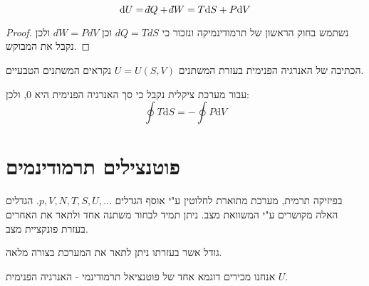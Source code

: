 \documentclass{tstextbook}
\begin{document}
\begin{proposition}
$$\mathrm{d}U=\;\bar{}\mkern-7.5mu dQ+\;\bar{}\mkern-7.5mu dW=T\mathrm{d}S + P\mathrm{d}V$$

\end{proposition}
\begin{proof}
נשתמש בחוק הראשון של תרמודינמיקה ונזכור כי \(dQ = TdS\) וכן \(dW = PdV\) ולכן נקבל את המבוקש.

\end{proof}
\begin{remark}
הכתיבה של האנרגיה הפנימית בעזרת המשתנים \(U=U(S,V)\) נקראים המשתנים הטבעיים. 

\end{remark}
\begin{proposition}
עבור מערכת ציקלית נקבל כי סך האנרגיה הפנימית היא 0, ולכן:
$$\oint T\mathrm{d}S = - \oint P \mathrm{d}V$$

\end{proposition}
\section{פוטנצילים תרמודינמים}

בפיזיקה תרמית, מערכת מתוארת לחלוטין ע"י אוסף הגדלים \(p,V,N,T,S,U, \dots\). הגדלים האלה מקושרים ע"י המשוואת מצב. ניתן תמיד לבחור משתנה אחד ולתאר את האחרים בעזרת פונקציית מצב.

\begin{definition}
גודל אשר בעזרתו ניתן לתאר את המערכת בצורה מלאה.

\end{definition}
אנחנו מכירים דוגמא אחד של פוטנציאל תרמודינמי - האנרגיה הפנימית \(U\).
\end{document}

